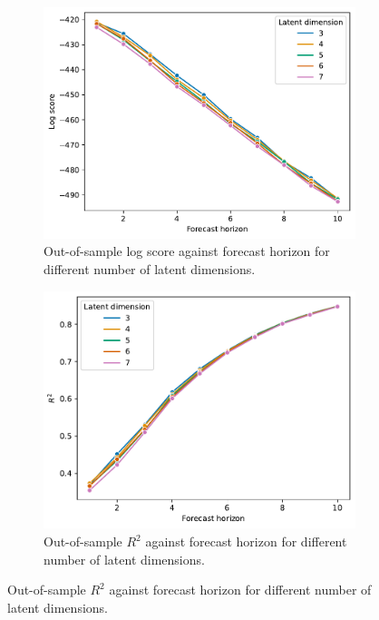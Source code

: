 \documentclass[preprint,12pt]{elsarticle}
\begin{document}
\begin{figure}
    \centering
    \begin{subfigure}[b]{0.3\textwidth}
        \centering
        \includegraphics[width=\textwidth]{figs/latent_dim_comparison.pdf}
        \caption{Out-of-sample log score against forecast horizon for different number of latent dimensions.}
        \label{fig:model_evaluation_sweden_logscore}
    \end{subfigure}
    \hfill
    \begin{subfigure}[b]{0.3\textwidth}
        \centering
        \includegraphics[width=\textwidth]{figs/latent_dim_comparison_R2.pdf}
        \caption{Out-of-sample $R^2$ against forecast horizon for different number of latent dimensions.}

\end{subfigure}
\end{figure}
\end{document}
